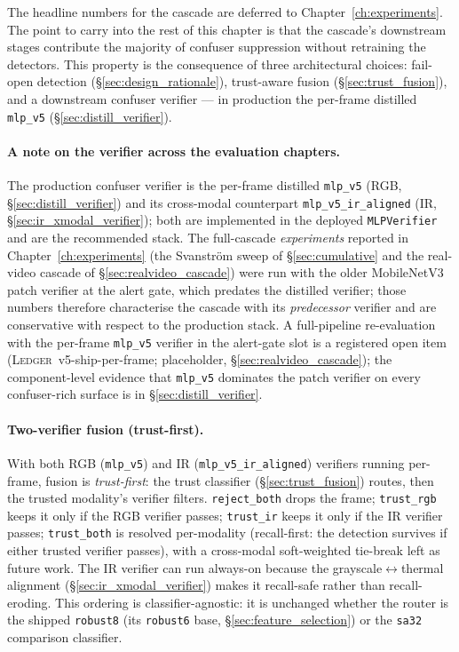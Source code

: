 \documentclass[12pt,a4paper,oneside,openright]{book}
\begin{document}
The headline numbers for the cascade are deferred to Chapter~\ref{ch:experiments}. The point to carry into the rest of this chapter is that the cascade's downstream stages contribute the majority of confuser suppression without retraining the detectors. This property is the consequence of three architectural choices: fail-open detection (\S\ref{sec:design_rationale}), trust-aware fusion (\S\ref{sec:trust_fusion}), and a downstream confuser verifier --- in production the per-frame distilled \texttt{mlp\_v5} (\S\ref{sec:distill_verifier}).

\paragraph{A note on the verifier across the evaluation chapters.} The production confuser verifier is the per-frame distilled \texttt{mlp\_v5} (RGB, \S\ref{sec:distill_verifier}) and its cross-modal counterpart \texttt{mlp\_v5\_ir\_aligned} (IR, \S\ref{sec:ir_xmodal_verifier}); both are implemented in the deployed \texttt{MLPVerifier} and are the recommended stack. The full-cascade \emph{experiments} reported in Chapter~\ref{ch:experiments} (the Svanstr\"om sweep of \S\ref{sec:cumulative} and the real-video cascade of \S\ref{sec:realvideo_cascade}) were run with the older MobileNetV3 patch verifier at the alert gate, which predates the distilled verifier; those numbers therefore characterise the cascade with its \emph{predecessor} verifier and are conservative with respect to the production stack. A full-pipeline re-evaluation with the per-frame \texttt{mlp\_v5} verifier in the alert-gate slot is a registered open item (\textsc{Ledger}~v5-ship-per-frame; placeholder, \S\ref{sec:realvideo_cascade}); the component-level evidence that \texttt{mlp\_v5} dominates the patch verifier on every confuser-rich surface is in \S\ref{sec:distill_verifier}.

\paragraph{Two-verifier fusion (trust-first).} With both RGB (\texttt{mlp\_v5}) and IR (\texttt{mlp\_v5\_ir\_aligned}) verifiers running per-frame, fusion is \emph{trust-first}: the trust classifier (\S\ref{sec:trust_fusion}) routes, then the trusted modality's verifier filters. \texttt{reject\_both} drops the frame; \texttt{trust\_rgb} keeps it only if the RGB verifier passes; \texttt{trust\_ir} keeps it only if the IR verifier passes; \texttt{trust\_both} is resolved per-modality (recall-first: the detection survives if either trusted verifier passes), with a cross-modal soft-weighted tie-break left as future work. The IR verifier can run always-on because the grayscale$\leftrightarrow$thermal alignment (\S\ref{sec:ir_xmodal_verifier}) makes it recall-safe rather than recall-eroding. This ordering is classifier-agnostic: it is unchanged whether the router is the shipped \texttt{robust8} (its \texttt{robust6} base, \S\ref{sec:feature_selection}) or the \texttt{sa32} comparison classifier.
\end{document}
